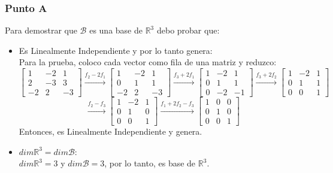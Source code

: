 \documentclass[a4paper,12pt]{article}
\begin{document}
\subsubsection{Punto A}
Para demostrar que $\mathcal{B}$ es una base de $\mathds{R}^3$ debo probar que:
\begin{itemize}
    \item Es Linealmente Independiente y por lo tanto genera: \\
    Para la prueba, coloco cada vector como fila de una matriz y reduzco:
    $$
    \begin{bmatrix}
        1 & -2 & 1 \\
        2 & -3 & 3 \\
        -2 & 2 & -3
    \end{bmatrix}
    \xrightarrow[]{f_2-2f_1}
    \begin{bmatrix}
        1 & -2 & 1 \\
        0 & 1 & 1 \\
        -2 & 2 & -3
    \end{bmatrix}
    \xrightarrow[]{f_3+2f_1}
    \begin{bmatrix}
        1 & -2 & 1 \\
        0 & 1 & 1 \\
        0 & -2 & -1
    \end{bmatrix}
    \xrightarrow[]{f_3+2f_2}
    \begin{bmatrix}
        1 & -2 & 1 \\
        0 & 1 & 1 \\
        0 & 0 & 1
    \end{bmatrix}
    $$
    $$
    \xrightarrow[]{f_2-f_3}
    \begin{bmatrix}
        1 & -2 & 1 \\
        0 & 1 & 0 \\
        0 & 0 & 1
    \end{bmatrix}
    \xrightarrow[]{f_1+2f_2-f_3}
    \begin{bmatrix}
        1 & 0 & 0 \\
        0 & 1 & 0 \\
        0 & 0 & 1
    \end{bmatrix}
    $$
    Entonces, es Linealmente Independiente y genera.
    \item $dim\mathds{R}^3=dim\mathcal{B}$: \\
    $dim\mathds{R}^3=3$ y $dim\mathcal{B}=3$, por lo tanto, es base de $\mathds{R}^3$.
\end{itemize}
\end{document}
